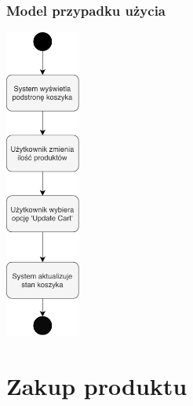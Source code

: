 \documentclass[10pt]{report}
\begin{document}
			\subsubsection{Model przypadku użycia}
				\begin{center}
					\includegraphics[width=70pt]{koszyk2.pdf}
				\end{center}
	
	
	\section{Zakup produktu}
	
		
\end{document}
